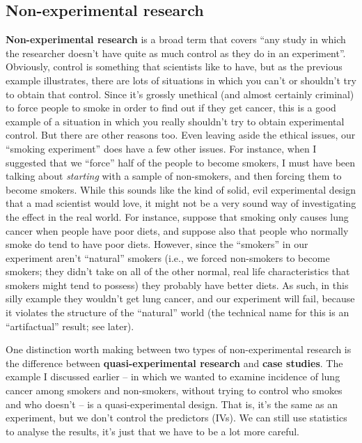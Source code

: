 \documentclass[
]{book}
\begin{document}
\subsection{Non-experimental research}\label{non-experimental-research}

\textbf{Non-experimental research} is a broad term that covers ``any study in which the researcher doesn't have quite as much control as they do in an experiment''. Obviously, control is something that scientists like to have, but as the previous example illustrates, there are lots of situations in which you can't or shouldn't try to obtain that control. Since it's grossly unethical (and almost certainly criminal) to force people to smoke in order to find out if they get cancer, this is a good example of a situation in which you really shouldn't try to obtain experimental control. But there are other reasons too. Even leaving aside the ethical issues, our ``smoking experiment'' does have a few other issues. For instance, when I suggested that we ``force'' half of the people to become smokers, I must have been talking about {\emph{starting}} with a sample of non-smokers, and then forcing them to become smokers. While this sounds like the kind of solid, evil experimental design that a mad scientist would love, it might not be a very sound way of investigating the effect in the real world. For instance, suppose that smoking only causes lung cancer when people have poor diets, and suppose also that people who normally smoke do tend to have poor diets. However, since the ``smokers'' in our experiment aren't ``natural'' smokers (i.e., we forced non-smokers to become smokers; they didn't take on all of the other normal, real life characteristics that smokers might tend to possess) they probably have better diets. As such, in this silly example they wouldn't get lung cancer, and our experiment will fail, because it violates the structure of the ``natural'' world (the technical name for this is an ``artifactual'' result; see later).

One distinction worth making between two types of non-experimental research is the difference between \textbf{quasi-experimental research} and \textbf{case studies}. The example I discussed earlier -- in which we wanted to examine incidence of lung cancer among smokers and non-smokers, without trying to control who smokes and who doesn't -- is a quasi-experimental design. That is, it's the same as an experiment, but we don't control the predictors (IVs). We can still use statistics to analyse the results, it's just that we have to be a lot more careful.
\end{document}

